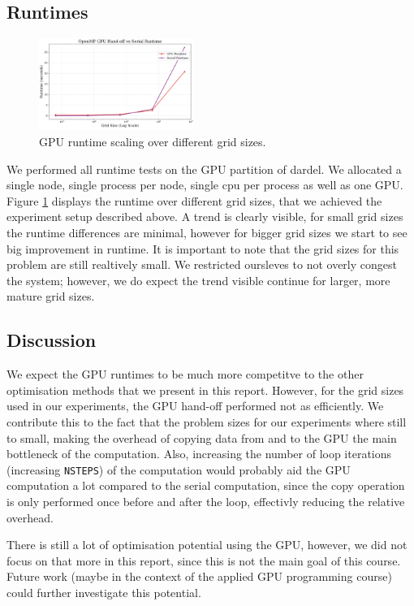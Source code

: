 \documentclass[a4paper,10pt]{article}
\begin{document}
\begin{multicols}{2}
\subsection{Runtimes}
\begin{figure}[H]
     \centering
     \includegraphics[width=0.45\textwidth]{../images/2_openmp/gpu_comparison.png}
     \caption{GPU runtime scaling over different grid sizes.}
     \label{fig:2_gpu_scaling}
\end{figure}
We performed all runtime tests on the GPU partition of dardel.
We allocated a single node, single process per node, single cpu per process as well as one GPU.
Figure \ref{fig:2_gpu_scaling} displays the runtime over different grid sizes, that we achieved the experiment setup described above.
A trend is clearly visible, for small grid sizes the runtime differences are minimal, however for bigger grid sizes we start to see big improvement in runtime.
It is important to note that the grid sizes for this problem are still realtively small.
We restricted oursleves to not overly congest the system; however, we do expect the trend visible continue for larger, more mature grid sizes.

\subsection{Discussion}
We expect the GPU runtimes to be much more competitve to the other optimisation methods that we present in this report.
However, for the grid sizes used in our experiments, the GPU hand-off performed not as efficiently.
We contribute this to the fact that the problem sizes for our experiments where still to small, making the overhead of copying data from and to the GPU the main bottleneck of the computation.
Also, increasing the number of loop iterations (increasing \verb|NSTEPS|) of the computation would probably aid the GPU computation a lot compared to the serial computation, since the copy operation is only performed once before and after the loop, effectivly reducing the relative overhead.

There is still a lot of optimisation potential using the GPU, however, we did not focus on that more in this report, since this is not the main goal of this course.
Future work (maybe in the context of the applied GPU programming course) could further investigate this potential.


\end{multicols}
\end{document}
